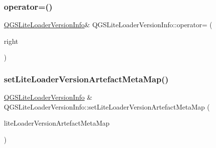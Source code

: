 \mbox{\label{class_q_g_s_lite_loader_version_info_ae0050f6918afd7c675cf81ee9b3abd2d}} 
\subsubsection{\texorpdfstring{operator=()}{operator=()}\hspace{0.1cm}{\footnotesize\ttfamily [2/2]}}
{\footnotesize\ttfamily \mbox{\hyperlink{class_q_g_s_lite_loader_version_info}{Q\+G\+S\+Lite\+Loader\+Version\+Info}}\& Q\+G\+S\+Lite\+Loader\+Version\+Info\+::operator= (\begin{DoxyParamCaption}\item[{\mbox{\hyperlink{class_q_g_s_lite_loader_version_info}{Q\+G\+S\+Lite\+Loader\+Version\+Info}} \&\&}]{right }\end{DoxyParamCaption})\hspace{0.3cm}{\ttfamily [default]}}

\mbox{\label{class_q_g_s_lite_loader_version_info_a80c3f62697c4db40c72752364a069fa9}} 
\subsubsection{\texorpdfstring{set\+Lite\+Loader\+Version\+Artefact\+Meta\+Map()}{setLiteLoaderVersionArtefactMetaMap()}}
{\footnotesize\ttfamily \mbox{\hyperlink{class_q_g_s_lite_loader_version_info}{Q\+G\+S\+Lite\+Loader\+Version\+Info}} \& Q\+G\+S\+Lite\+Loader\+Version\+Info\+::set\+Lite\+Loader\+Version\+Artefact\+Meta\+Map (\begin{DoxyParamCaption}\item[{const Q\+Map$<$ Q\+String, \mbox{\hyperlink{class_q_g_s_lite_loader_version_meta}{Q\+G\+S\+Lite\+Loader\+Version\+Meta}} $>$ \&}]{lite\+Loader\+Version\+Artefact\+Meta\+Map }\end{DoxyParamCaption})}

